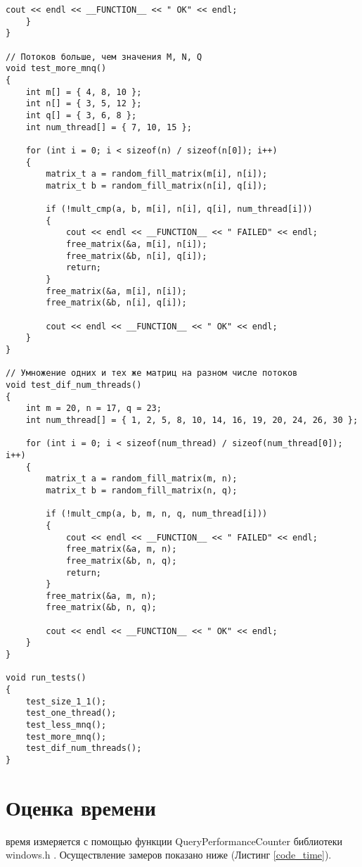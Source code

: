 \begin{lstlisting}[label=code_test, caption = Тесты, captionpos=b]
		cout << endl << __FUNCTION__ << " OK" << endl;
	}
}

// Потоков больше, чем значения M, N, Q
void test_more_mnq()
{
	int m[] = { 4, 8, 10 };
	int n[] = { 3, 5, 12 };
	int q[] = { 3, 6, 8 };
	int num_thread[] = { 7, 10, 15 };
	
	for (int i = 0; i < sizeof(n) / sizeof(n[0]); i++)
	{
		matrix_t a = random_fill_matrix(m[i], n[i]);
		matrix_t b = random_fill_matrix(n[i], q[i]);
		
		if (!mult_cmp(a, b, m[i], n[i], q[i], num_thread[i]))
		{
			cout << endl << __FUNCTION__ << " FAILED" << endl;
			free_matrix(&a, m[i], n[i]);
			free_matrix(&b, n[i], q[i]);
			return;
		}
		free_matrix(&a, m[i], n[i]);
		free_matrix(&b, n[i], q[i]);
		
		cout << endl << __FUNCTION__ << " OK" << endl;
	}
}

// Умножение одних и тех же матриц на разном числе потоков
void test_dif_num_threads()
{
	int m = 20, n = 17, q = 23;
	int num_thread[] = { 1, 2, 5, 8, 10, 14, 16, 19, 20, 24, 26, 30 };
	
	for (int i = 0; i < sizeof(num_thread) / sizeof(num_thread[0]); i++)
	{
		matrix_t a = random_fill_matrix(m, n);
		matrix_t b = random_fill_matrix(n, q);
		
		if (!mult_cmp(a, b, m, n, q, num_thread[i]))
		{
			cout << endl << __FUNCTION__ << " FAILED" << endl;
			free_matrix(&a, m, n);
			free_matrix(&b, n, q);
			return;
		}
		free_matrix(&a, m, n);
		free_matrix(&b, n, q);
		
		cout << endl << __FUNCTION__ << " OK" << endl;
	}
}

void run_tests()
{
	test_size_1_1();
	test_one_thread();
	test_less_mnq();
	test_more_mnq();
	test_dif_num_threads();
}
\end{lstlisting}

\section{Оценка времени}
 время измеряется с помощью функции QueryPerformanceCounter библиотеки windows.h \cite{Query}. Осуществление замеров показано ниже (Листинг \ref{code_time}).\\

